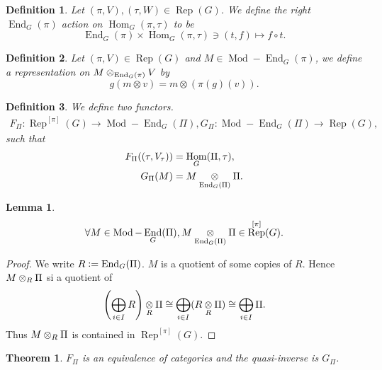\documentclass[8pt]{article}
\newtheorem{theorem}{Theorem} [section]
\newtheorem{definition}{Definition}[section]
\newtheorem{lemma}{Lemma}[section]
\DeclareMathOperator{\Rep}{Rep}
\DeclareMathOperator{\Hom}{Hom}
\DeclareMathOperator{\End}{End}
\DeclareMathOperator{\Mod}{Mod}
\newcommand{\defeq}{\vcentcolon=}
\newcommand{\tens}[1]{%
  \mathbin{\mathop{\otimes}\displaylimits_{#1}}%
}
\begin{document}
\begin{definition}
  Let $(\pi,V),(\tau,W)\in\Rep(G)$. We define the right $\End_G(\pi)$ action on $\Hom_G(\pi,\tau)$ to be
  \begin{equation*}
    \End_G(\pi)\times \Hom_G(\pi,\tau)\ni(t,f)\mapsto f\circ t.
  \end{equation*}
\end{definition}
\begin{definition}
  Let $(\pi,V)\in\Rep(G)$ and $M\in\Mod-\End_G(\pi)$, we define a representation on $M\tens{\End_G(\pi)}V$ by 
  \begin{equation*}
    g(m\otimes v) = m\otimes(\pi(g)(v)).
  \end{equation*}
\end{definition}
\begin{definition}
  We define two functors.
  \begin{align*}
    F_\Pi:\Rep^{[\pi]}(G)\to\Mod-\End_G(\Pi), G_\Pi:\Mod-\End_G(\Pi)\to\Rep(G),
  \end{align*}
  such that 
  \begin{align*}
    F_\Pi((\tau,V_\tau)) &= \Hom_G(\Pi,\tau),\\
    G_\Pi(M) & = M\tens{\End_G(\Pi)}\Pi.
  \end{align*}
\end{definition}
\begin{lemma}
  \label{lemma_65}
  \begin{equation*}
    \forall M\in\Mod-\End_G(\Pi),M\tens{\End_G(\Pi)}\Pi\in\Rep^{[\pi]}(G).
  \end{equation*}
\end{lemma}
\begin{proof}
  We write $R\defeq\End_G(\Pi)$. $M$ is a quotient of some copies of $R$. Hence $M\tens{R}\Pi$ si a quotient of 
  \begin{equation*}
    \left(\bigoplus_{i\in I}R\right)\tens{R}\Pi\cong \bigoplus_{i\in I}(R\tens{R}\Pi)\cong \bigoplus_{i\in I}\Pi.
  \end{equation*}
  Thus $M\tens{R}\Pi$ is contained in $\Rep^{[\pi]}(G)$. 
\end{proof}
  \setcounter{claim}{0}
\begin{theorem}
  \label{theorem_66}
  $F_\Pi$ is an equivalence of categories and the quasi-inverse is $G_\Pi$.
\end{theorem}
\end{document}
